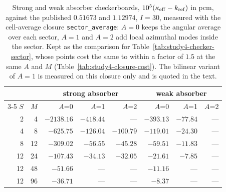 \begin{table}[htbp]
\centering
\caption{Strong and weak absorber checkerboards, $10^{5}(\kappa_{\mathrm{eff}}-k_\mathrm{ref})$ in pcm, against the published $0.51673$ and $1.12974$, $I{=}30$, measured with the cell-average closure \texttt{sector\_average}: $A{=}0$ keeps the angular average over each sector, $A{=}1$ and $A{=}2$ add local azimuthal modes inside the sector. Kept as the comparison for Table~\ref{tab:study4-checker-sector}, whose points cost the same to within a factor of $1.5$ at the same $A$ and $M$ (Table~\ref{tab:study4-closure-cost}). The bilinear variant of $A{=}1$ is measured on this closure only and is quoted in the text.}
\label{tab:study4-checker-average}
\centering\small
\begin{tabular}{rrrrrrrr}
\hline
& & \multicolumn{3}{c}{strong absorber} &
  \multicolumn{3}{c}{weak absorber}\\
\cline{3-5}\cline{6-8}
$S$ & $M$ & $A$=0 & $A$=1 & $A$=2 & $A$=0 & $A$=1 & $A$=2\\
\hline
2 & 4 & $-2138.16$ & $-418.44$ & --- & $-393.13$ & $-77.84$ & ---\\
4 & 8 & $-625.75$ & $-126.04$ & $-100.79$ & $-119.01$ & $-24.30$ & ---\\
8 & 12 & $-309.02$ & $-56.55$ & $-45.28$ & $-59.51$ & $-11.83$ & ---\\
12 & 24 & $-107.43$ & $-34.13$ & $-32.05$ & $-21.61$ & $-7.85$ & ---\\
12 & 48 & $-51.66$ & --- & --- & $-11.16$ & --- & ---\\
12 & 96 & $-36.71$ & --- & --- & $-8.37$ & --- & ---\\
\hline
\end{tabular}
\end{table}

